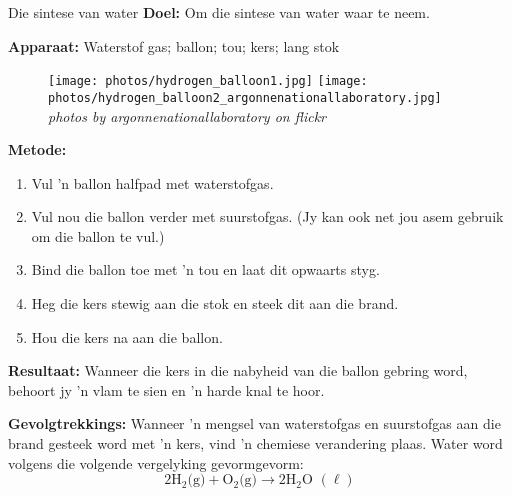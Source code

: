  \par
            \begin{g_experiment}{Die sintese van water}
            \nopagebreak
            \label{m38709*id63175}\noindent{}\textbf{Doel:}\newline
    Om die sintese van water waar te neem. \par 
        \label{m38709*id63194}\noindent{}\textbf{Apparaat:}\newline
    Waterstof gas; ballon; tou; kers; lang stok\par 
      \label{m38709*id63199}
    \setcounter{subfigure}{0}
	\begin{figure}[H] %
    \begin{center}
\texttt{[image: photos/hydrogen\_balloon1.jpg]} 
\texttt{[image: photos/hydrogen\_balloon2\_argonnenationallaboratory.jpg]} \\
\textsl{photos by argonnenationallaboratory on flickr}
    \end{center}
 \end{figure}  
        \label{m38709*id63206}\noindent{}\textbf{Metode:}\label{m38709*id63212}\begin{enumerate}[noitemsep, label=\textbf{\arabic*}. ] 
\item Vul 'n ballon halfpad met waterstofgas.
\item Vul nou die ballon verder met suurstofgas. (Jy kan ook net jou asem gebruik om die ballon te vul.)
\item Bind die ballon toe met  'n tou en laat dit opwaarts styg.
\item Heg die kers stewig aan die stok en steek dit aan die brand.
\item Hou die kers na aan die ballon.
\end{enumerate}
        \par 
        \label{m38709*id63254}\noindent{}\textbf{Resultaat:}\newline
Wanneer die kers in die nabyheid van die ballon gebring word, behoort jy 'n vlam te sien en 'n harde knal te hoor.\par 
        \label{m38709*id63302}\noindent{}\textbf{Gevolgtrekkings:}\newline
Wanneer 'n mengsel van waterstofgas en suurstofgas aan die brand gesteek word met 'n kers, vind 'n chemiese verandering plaas. Water word  volgens die volgende vergelyking gevormgevorm:
        \label{m38709*id63313}\nopagebreak\noindent{}
    \begin{equation*}
    2{\text{H}}_{2} \text{(g)} + {\text{O}}_{2}\text{(g)} \to 2\text{H}_{2}\text{O } (\ell)
      \end{equation*}   
\end{g_experiment}
